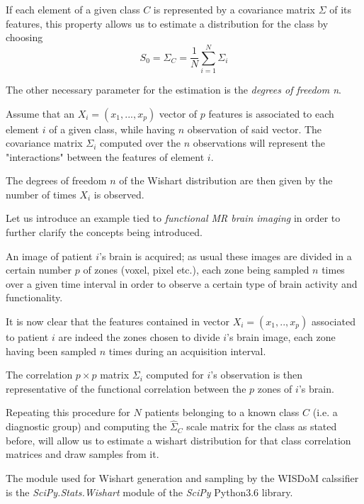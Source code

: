 \documentclass[12pt,openright,twoside,a4paper]{book}
\begin{document}
If each element of a given class $C$ is represented by a covariance matrix $\Sigma$ of its features, this property allows us to estimate a distribution for the class by choosing 
\begin{equation}
S_0=\hat{\Sigma}_C=\frac{1}{N}\sum_{i=1}^N \Sigma_i
\label{Class-Scale}
\end{equation}


The other necessary parameter for the estimation is the \textit{degrees of freedom n}.

Assume that an $X_i=(x_1, ..., x_p)$ vector of $p$ features is associated to each element $i$ of a given class, while having $n$ observation of said vector. The covariance matrix $\Sigma_i$ computed over the $n$ observations will represent the "interactions" between the features of element $i$.

The degrees of freedom  $n$ of the Wishart distribution are then given by the number of times $X_i$ is observed.

Let us introduce an example tied to \textit{functional MR brain imaging } in order to further clarify the concepts being introduced. 

An image of patient $i$'s brain is acquired; as usual these images are divided in a certain number $p$ of zones (voxel, pixel etc.), each zone being sampled $n$ times over a given time interval in order to observe a certain type of brain activity and functionality.

It is now clear that the features contained in vector $X_i=(x_1,..,x_p)$ associated to patient $i$ are indeed the zones chosen to divide $i$'s brain image, each zone having been sampled $n$ times during an acquisition interval.

The correlation $p \times p$ matrix $\Sigma_i$ computed for $i$'s observation is then representative of the functional correlation between the $p$ zones of $i$'s brain.

Repeating this procedure for $N$ patients belonging to a known class $C$ (i.e. a diagnostic group) and computing the $\hat{\Sigma}_C$ scale matrix for the class as stated before, will allow us to estimate a wishart distribution for that class correlation matrices and draw samples from it.

\vspace{5mm}

The module used for Wishart generation and sampling by the WISDoM calssifier is the \textit{SciPy.Stats.Wishart} module of the \textit{SciPy} Python3.6 library.
\end{document}
